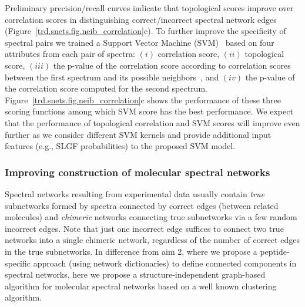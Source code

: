 \documentclass[arial,11pt]{article}
\begin{document}
Preliminary precision/recall curves indicate that topological scores improve over correlation scores in distinguishing correct/incorrect spectral network edges (Figure~\ref{trd.snets.fig.neib_correlation}c). To further improve the specificity of spectral pairs we trained a Support Vector Machine%
(SVM)~\cite{vapnik95} based on four attributes from each pair of spectra: $(i)$ correlation score, $(ii)$ topological score, $(iii)$ the p-value of the correlation score according to correlation scores between the first spectrum and its possible neighbors~\cite{bandeira07pnas}, and $(iv)$ the p-value of the correlation score computed for the second spectrum. Figure~\ref{trd.snets.fig.neib_correlation}c shows the performance of these three scoring functions among which SVM score has the best performance. We expect that the performance of topological correlation and SVM scores will improve even further as we consider different SVM kernels and provide additional input features (e.g., SLGF probabilities) to the proposed SVM model.

\subsubsection{Improving construction of molecular spectral networks}\label{trd.snets.aim.molnets.nets}

Spectral networks resulting from experimental data usually contain {\em true} subnetworks formed by spectra connected by correct edges (between related molecules) and {\em chimeric} networks connecting true subnetworks via a few random incorrect edges.
Note that just one incorrect edge suffices to connect two true networks into a single chimeric network, regardless of the number of correct edges in the true subnetworks. In difference from aim 2, where we propose a peptide-specific approach (using network dictionaries) to define connected components in spectral networks, here we propose a structure-independent graph-based algorithm for molecular spectral networks based on a well known clustering algorithm.
\end{document}
